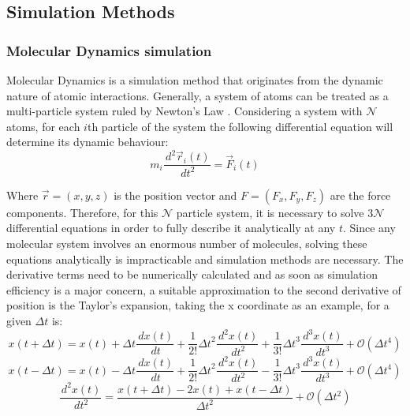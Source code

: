 \documentclass[10pt,a4paper,twoside]{article}
\begin{document}
\subsection{Simulation Methods}
\subsubsection{Molecular Dynamics simulation}

Molecular Dynamics is a simulation method that originates from the dynamic nature of atomic interactions. Generally, a system of atoms can be treated as a multi-particle system ruled by Newton's Law \cite{umd}. Considering a system with $\mathcal{N}$ atoms, for each $i$th particle of the system the following differential equation will determine its dynamic behaviour:
\begin{equation}
m_i\dfrac{\,d^2\vec{r}_i(t)}{\,dt^2} = \vec{F}_i(t)
\label{eqn:newton}
\end{equation}

Where $\vec{r} = (x,y,z)$ is the position vector and $F = (F_x, F_y, F_z)$ are the force components. Therefore, for this $\mathcal{N}$ particle system, it is necessary to solve $3\mathcal{N}$ differential equations in order to fully describe it analytically at any $t$. Since any molecular system involves an enormous number of molecules, solving these equations analytically is impracticable and simulation methods are necessary. The derivative terms need to be numerically calculated and as soon as simulation efficiency is a major concern, a suitable approximation to the second derivative of position is the Taylor's expansion, taking the x coordinate as an example, for a given $\Delta t$ is:
\begin{equation}
x(t+\Delta t) = x(t) + \Delta t \dfrac{\,dx(t)}{\,dt} + \dfrac{1}{2!}{\Delta t}^2 \dfrac{\,d^2x(t)}{\,dt^2} + \dfrac{1}{3!}{\Delta t}^3 \dfrac{\,d^3x(t)}{\,dt^3} +  \mathcal{O}(\Delta t^4)
\label{eqn:taylor1}
\end{equation}
\begin{equation}
x(t-\Delta t) = x(t) - \Delta t \dfrac{\,dx(t)}{\,dt} + \dfrac{1}{2!}{\Delta t}^2 \dfrac{\,d^2x(t)}{\,dt^2} - \dfrac{1}{3!}{\Delta t}^3 \dfrac{\,d^3x(t)}{\,dt^3} +  \mathcal{O}(\Delta t^4)
\label{eqn:taylor2}
\end{equation}
\begin{equation}
\dfrac{\,d^2x(t)}{\,dt^2} = \dfrac{x(t+\Delta t) - 2 x(t) + x(t-\Delta t)}{{\Delta t}^2} +  \mathcal{O}(\Delta t^2)
\label{eqn:dx2}
\end{equation}
\end{document}
